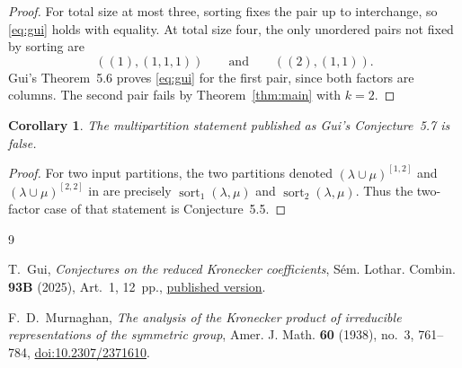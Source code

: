 \documentclass[11pt]{amsart}
\newtheorem{corollary}[theorem]{Corollary}
\newcommand{\sort}{\operatorname{sort}}
\begin{document}
\begin{proof}
For total size at most three, sorting fixes the pair up to interchange, so
\eqref{eq:gui} holds with equality.  At total size four, the only unordered
pairs not fixed by sorting are
\[
  ((1),(1,1,1))
  \qquad\text{and}\qquad
  ((2),(1,1)).
\]
Gui's Theorem~5.6 \cite{Gui} proves \eqref{eq:gui} for the first pair, since
both factors are columns.  The second pair fails by Theorem~\ref{thm:main}
with $k=2$.
\end{proof}

\begin{corollary}
The multipartition statement published as Gui's Conjecture~5.7 is false.
\end{corollary}

\begin{proof}
For two input partitions, the two partitions denoted
$(\lambda\cup\mu)^{[1,2]}$ and $(\lambda\cup\mu)^{[2,2]}$ in
\cite[Conjecture~5.7]{Gui} are precisely
$\sort_1(\lambda,\mu)$ and $\sort_2(\lambda,\mu)$.  Thus the two-factor case
of that statement is Conjecture~5.5.
\end{proof}

\begin{thebibliography}{9}

T.~Gui,
\emph{Conjectures on the reduced Kronecker coefficients},
S\'em. Lothar. Combin. \textbf{93B} (2025), Art.~1, 12~pp.,
\href{https://www.mat.univie.ac.at/~slc/wpapers/FPSAC2025/1.pdf}
{published version}.

F.~D.~Murnaghan,
\emph{The analysis of the Kronecker product of irreducible representations
of the symmetric group},
Amer. J. Math. \textbf{60} (1938), no.~3, 761--784,
\href{https://doi.org/10.2307/2371610}{doi:10.2307/2371610}.

\end{thebibliography}
\end{document}
